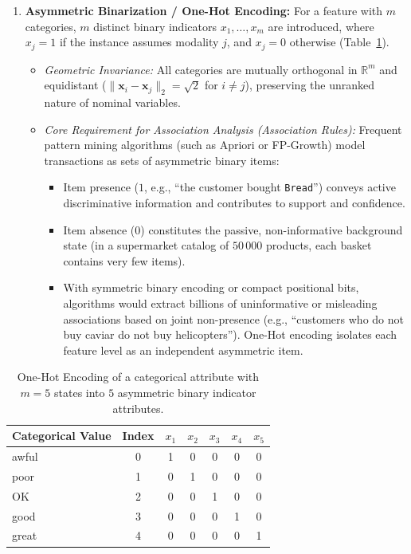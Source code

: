 \begin{enumerate}
    \item \textbf{Asymmetric Binarization / One-Hot Encoding:}
    For a feature with $m$ categories, $m$ distinct binary indicators $x_1, \dots, x_m$ are introduced, where $x_j = 1$ if the instance assumes modality $j$, and $x_j = 0$ otherwise (Table~\ref{tab:binarization-example}).
    \begin{itemize}
        \item \textit{Geometric Invariance:} All categories are mutually orthogonal in $\mathbb{R}^m$ and equidistant ($\|\mathbf{x}_i - \mathbf{x}_j\|_2 = \sqrt{2}$ for $i \ne j$), preserving the unranked nature of nominal variables.
        \item \textit{Core Requirement for Association Analysis (Association Rules):}
        Frequent pattern mining algorithms (such as Apriori or FP-Growth) model transactions as sets of asymmetric binary items:
        \begin{itemize}
            \item Item presence ($1$, e.g., ``the customer bought \texttt{Bread}'') conveys active discriminative information and contributes to support and confidence.
            \item Item absence ($0$) constitutes the passive, non-informative background state (in a supermarket catalog of $50\,000$ products, each basket contains very few items).
            \item With symmetric binary encoding or compact positional bits, algorithms would extract billions of uninformative or misleading associations based on joint non-presence (e.g., ``customers who do not buy caviar do not buy helicopters''). One-Hot encoding isolates each feature level as an independent asymmetric item.
        \end{itemize}
    \end{itemize}
\end{enumerate}

\begin{table}[H]
\centering
\small
\begin{tabular}{lcccccc}
\toprule
\textbf{Categorical Value} & \textbf{Index} & $x_1$ & $x_2$ & $x_3$ & $x_4$ & $x_5$ \\
\midrule
awful  & 0 & 1 & 0 & 0 & 0 & 0 \\
poor   & 1 & 0 & 1 & 0 & 0 & 0 \\
OK     & 2 & 0 & 0 & 1 & 0 & 0 \\
good   & 3 & 0 & 0 & 0 & 1 & 0 \\
great  & 4 & 0 & 0 & 0 & 0 & 1 \\
\bottomrule
\end{tabular}
\caption{One-Hot Encoding of a categorical attribute with $m=5$ states into $5$ asymmetric binary indicator attributes.}
\label{tab:binarization-example}
\end{table}

